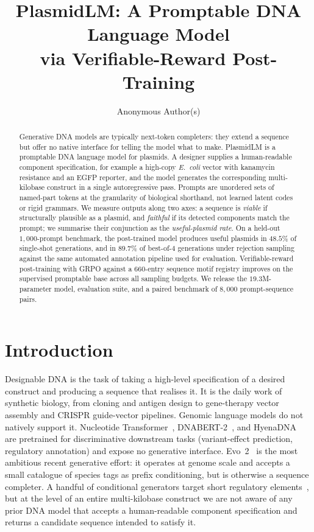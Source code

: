 \documentclass{article}
\title{PlasmidLM: A Promptable DNA Language Model\\via Verifiable-Reward Post-Training}
\author{%
  Anonymous Author(s)
}
\begin{document}
\maketitle

\begin{abstract}
  Generative DNA models are typically next-token completers: they extend a sequence
  but offer no native interface for telling the model what to make. PlasmidLM is a
  promptable DNA language model for plasmids. A designer supplies a human-readable
  component specification, for example a high-copy \textit{E.~coli} vector with
  kanamycin resistance and an EGFP reporter, and the model generates the corresponding
  multi-kilobase construct in a single autoregressive pass. Prompts are unordered sets
  of named-part tokens at the granularity of biological shorthand, not learned latent
  codes or rigid grammars. We measure outputs along two axes: a sequence is
  \emph{viable} if structurally plausible as a plasmid, and \emph{faithful} if its
  detected components match the prompt; we summarise their conjunction as the
  \emph{useful-plasmid rate}. On a held-out $1{,}000$-prompt benchmark, the post-trained
  model produces useful plasmids in $48.5\%$ of single-shot generations, and in $89.7\%$
  of best-of-$4$ generations under rejection sampling against the same automated
  annotation pipeline used for evaluation. Verifiable-reward post-training with GRPO
  against a $660$-entry sequence motif registry improves on the supervised promptable
  base across all sampling budgets.
  We release the $19.3$M-parameter model, evaluation suite, and a paired benchmark of
  $8{,}000$ prompt-sequence pairs.
\end{abstract}

\section{Introduction}
\label{sec:intro}

Designable DNA is the task of taking a high-level specification of a desired construct
and producing a sequence that realises it. It is the daily work of synthetic biology,
from cloning and antigen design to gene-therapy vector assembly and CRISPR guide-vector
pipelines. Genomic language models do not natively support
it. Nucleotide Transformer~\citep{dalla2023nucleotide},
DNABERT-2~\citep{zhou2024dnabert2}, and HyenaDNA~\citep{nguyen2024hyenadna} are
pretrained for discriminative downstream tasks (variant-effect prediction, regulatory
annotation) and expose no generative interface. Evo~2~\citep{brixi2025evo2} is the most
ambitious recent generative effort: it operates at genome scale and accepts a small
catalogue of species tags as prefix conditioning, but is otherwise a sequence completer.
A handful of conditional generators target short regulatory
elements~\citep{sample2019promoter,stark2024dirichlet,taskiran2024cre}, but at the level
of an entire multi-kilobase construct we are not aware of any prior DNA model that
accepts a human-readable component specification and returns a candidate sequence
intended to satisfy it.
\end{document}
